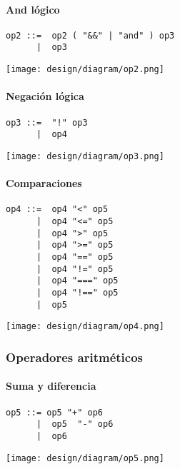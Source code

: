 \paragraph{And lógico}
\begin{multicols}{2}
\begin{lstlisting}[style=nonumbers]      
op2 ::=  op2 ( "&&" | "and" ) op3
      |  op3
\end{lstlisting}  
\columnbreak	
\begin{center}
\texttt{[image: design/diagram/op2.png]} 
\end{center}
\end{multicols}

\paragraph{Negación lógica}
\begin{multicols}{2}
\begin{lstlisting}[style=nonumbers]      
op3 ::=  "!" op3 
      |  op4
\end{lstlisting}  
\columnbreak	
\begin{center}
\texttt{[image: design/diagram/op3.png]} 
\end{center}
\end{multicols}

\paragraph{Comparaciones}
\begin{multicols}{2}
\begin{lstlisting}[style=nonumbers]      
op4 ::=  op4 "<" op5
      |  op4 "<=" op5
      |  op4 ">" op5
      |  op4 ">=" op5
      |  op4 "==" op5
      |  op4 "!=" op5
      |  op4 "===" op5
      |  op4 "!==" op5
      |  op5
\end{lstlisting}  
\columnbreak	
\begin{center}
\texttt{[image: design/diagram/op4.png]} 
\end{center}
\end{multicols}

\subsubsection{Operadores aritméticos}
\paragraph{Suma y diferencia}
\begin{multicols}{2}
\begin{lstlisting}[style=nonumbers]      
op5 ::= op5 "+" op6
      |  op5  "-" op6
      |  op6
\end{lstlisting}  
\columnbreak	
\begin{center}
\texttt{[image: design/diagram/op5.png]} 
\end{center}
\end{multicols}

